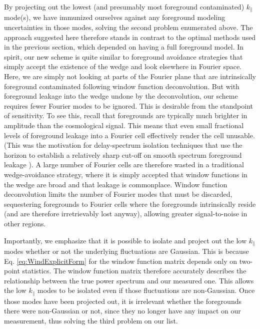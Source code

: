\documentclass[twocolumn,aps,prd,nofootinbib,showpacs]{revtex4-1}
\begin{document}
By projecting out the lowest (and presumably most foreground contaminated) $k_\parallel$ mode(s), we have immunized ourselves against any foreground modeling uncertainties in those modes, solving the second problem enumerated above.  The approach suggested here therefore stands in contrast to the optimal methods used in the previous section, which depended on having a full foreground model.  In spirit, our new scheme is quite similar to foreground avoidance strategies that simply accept the existence of the wedge and look elsewhere in Fourier space.  Here, we are simply not looking at parts of the Fourier plane that are intrinsically foreground contaminated following window function deconvolution.  But with foreground leakage into the wedge undone by the deconvolution, our scheme requires fewer Fourier modes to be ignored.  This is desirable from the standpoint of sensitivity.  To see this, recall that foregrounds are typically much brighter in amplitude than the cosmological signal.  This means that even small fractional levels of foreground leakage into a Fourier cell effectively render the cell unusable.  (This was the motivation for delay-spectrum isolation techniques that use the horizon to establish a relatively sharp cut-off on smooth spectrum foreground leakage \cite{Parsons2012b,Parsons2013}).  A large number of Fourier cells are therefore wasted in a traditional wedge-avoidance strategy, where it is simply accepted that window functions in the wedge are broad and that leakage is commonplace.  Window function deconvolution limits the number of Fourier modes that must be discarded, sequestering foregrounds to Fourier cells where the foregrounds intrinsically reside (and are therefore irretrievably lost anyway), allowing greater signal-to-noise in other regions.

Importantly, we emphasize that it is possible to isolate and project out the low $k_\parallel$ modes whether or not the underlying fluctuations are Gaussian.  This is because Eq. \eqref{eq:WindExplicitForm} for the window function matrix depends only on two-point statistics.  The window function matrix therefore accurately describes the relationship between the true power spectrum and our measured one.  This allows the low $k_\parallel$ modes to be isolated even if those fluctuations are non-Gaussian.  Once those modes have been projected out, it is irrelevant whether the foregrounds there were non-Gaussian or not, since they no longer have any impact on our measurement, thus solving the third problem on our list.
\end{document}
